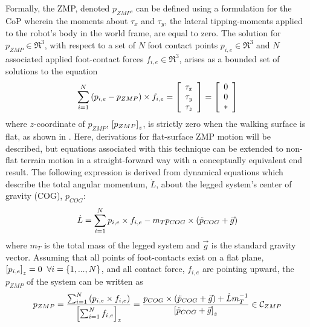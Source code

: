 		Formally, the ZMP, denoted $p_{ZMP}$, can be defined using a formulation for the CoP wherein the moments about $\tau_{x}$ and $\tau_{y}$, the lateral tipping-moments applied to the robot's body in the world frame, are equal to zero. The solution for $p_{ZMP}\in\Re^{3}$, with respect to a set of $N$ foot contact points $p_{i,e}\in\Re^{3}$ and $N$ associated applied foot-contact forces $f_{i,e}\in\Re^{3}$, arises as a bounded set of solutions to the equation
			\begin{equation}
				\sum^{N}_{i=1}\left(p_{i,e}-p_{ZMP}\right)\times f_{i,e} 
				= 
				\left[
					\begin{array}{c}
						\tau_{x}	\\
						\tau_{y}	\\
						\tau_{z}
					\end{array}
				\right]
				=
				\left[
					\begin{array}{c}
						0			\\
						0			\\
						*
					\end{array}
				\right]
			\end{equation}
		where $z$-coordinate of $p_{ZMP}$, $\left[p_{ZMP}\right]_{z}$, is strictly zero when the walking surface is flat, as shown in \cite{Wieber2015}. Here, derivations for flat-surface ZMP motion will be described, but equations associated with this technique can be extended to non-flat terrain motion in a straight-forward way with a conceptually equivalent end result. The following expression is derived from dynamical equations which describe the total angular momentum, $\dot{L}$, about the legged system's center of gravity (COG), $p_{COG}$:
			\begin{equation}
				\dot{L} = \sum_{i=1}^{N} p_{i,e}\times f_{i,e} - m_{T} p_{COG} \times \left( \ddot{p}_{COG} + \vec{g} \right)
			\end{equation}
		where $m_{T}$ is the total mass of the legged system and $\vec{g}$ is the standard gravity vector. Assuming that all points of foot-contacts exist on a flat plane, \IE $\left[p_{i,e}\right]_{z}=0\hspace{2mm} \forall i=\{1,...,N\}$, and all contact force, $f_{i,e}$ are pointing upward, the $p_{ZMP}$ of the system can be written as
			\begin{equation}
				p_{ZMP} 
				= 
				\frac{ \sum_{i=1}^{N} \left( p_{i,e} \times f_{i,e} \right) }{ \left[\sum_{i=1}^{N} f_{i,e}\right]_{z} }
				= 
				\frac{ 	p_{COG} \times \left( \ddot{p}_{COG} + \vec{g} \right) + \dot{L}m_{T}^{-1} }{ \left[ \ddot{p}_{COG} + \vec{g} \right]_{z}}
				\in {\cal C}_{ZMP} 
			\end{equation}
